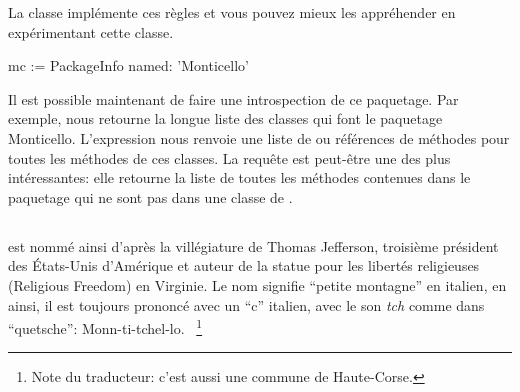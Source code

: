\documentclass[a4paper,10pt,twoside]{book}
\begin{document}
La classe  implémente ces règles et vous pouvez mieux les 
appréhender en expérimentant cette classe.



\begin{code}{}
mc := PackageInfo named: 'Monticello'
\end{code}

Il est possible maintenant de faire une introspection de ce paquetage.
Par exemple,  nous retourne la longue liste
des classes qui font le paquetage Monticello.  
L'expression 
nous renvoie une liste de \mbox{} ou références de méthodes
pour toutes les méthodes de ces classes.
La requête  est peut-être une des plus
intéressantes: elle retourne la liste de toutes les méthodes contenues
dans le paquetage  qui ne sont pas dans une classe de
. %




\subsection{}

 est nommé ainsi d'après la villégiature 
de Thomas Jefferson, troisième président des États-Unis d'Amérique
et auteur de la statue pour les libertés religieuses (Religious Freedom) en
Virginie. Le nom signifie ``petite montagne'' en italien, en ainsi, il est
toujours prononcé avec un ``c'' italien, \ie avec le son \emph{tch} comme
dans ``quetsche'':
Monn-ti-tchel-lo.
~\footnote{Note du traducteur: c'est aussi une commune de Haute-Corse.}
\end{document}

